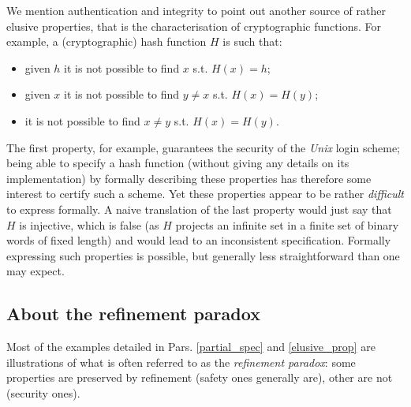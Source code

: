 \documentclass[conference]{IEEEtran}
\begin{document}
We mention authentication and integrity to point out another source of rather elusive
properties, that is the characterisation of cryptographic functions. For example, a
(cryptographic) hash function {\small$H$} is such that:
\begin{itemize}
\item given {\small$h$} it is not possible to find {\small$x$} s.t. {\small$H(x)\!=\!h$};
\item given {\small$x$} it is not possible to find {\small$y\!\not=\!x$} s.t.
{\small$H(x)\!=\!H(y)$};
\item it is not possible to find {\small$x\!\not=\!y$} s.t. {\small$H(x)\!=\!H(y)$}.
\end{itemize}
The first property, for example, guarantees the security of the \emph{Unix} login scheme;
being able to specify a hash function (without giving any details on its implementation) by
formally describing these properties has therefore some interest to certify such a scheme. Yet
these properties appear to be rather \emph{difficult} to express formally. A naive translation
of the last property would just say that {\small$H$} is injective, which is false (as
{\small$H$} projects an infinite set in a finite set of binary words of fixed length) and
would lead to an inconsistent specification. Formally expressing such properties is possible,
but generally less straightforward than one may expect.

\subsection{About the refinement paradox}\label{refinement_paradox}

Most of the examples detailed in Pars. \ref{partial_spec} and \ref{elusive_prop} are
illustrations of what is often referred to as the \emph{refinement paradox}: some properties
are preserved by refinement (safety ones generally are), other are not (security ones).
\end{document}
